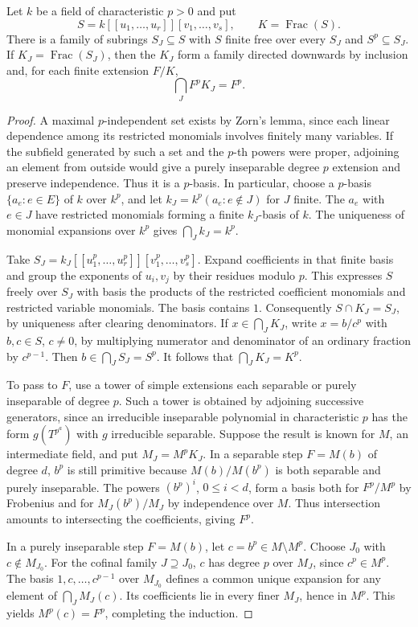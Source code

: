 \begin{lemma}\label{res:X04}
Let \(k\) be a field of characteristic \(p>0\) and put
\[
 S=k[[u_1,\ldots,u_r]][v_1,\ldots,v_s],\qquad K=\operatorname{Frac}(S).
\]
There is a family of subrings \(S_J\subseteq S\) with \(S\) finite free over every \(S_J\) and \(S^p\subseteq S_J\). If \(K_J=\operatorname{Frac}(S_J)\), then the \(K_J\) form a family directed downwards by inclusion and, for each finite extension \(F/K\),
\[
                    \bigcap_J F^pK_J=F^p .
\]
\end{lemma}
\begin{proof}
A maximal \(p\)-independent set exists by Zorn's lemma, since each linear dependence among its restricted monomials involves finitely many variables. If the subfield generated by such a set and the \(p\)-th powers were proper, adjoining an element from outside would give a purely inseparable degree \(p\) extension and preserve independence. Thus it is a \(p\)-basis. In particular, choose a \(p\)-basis \(\{a_e:e\in E\}\) of \(k\) over \(k^p\), and let \(k_J=k^p(a_e:e\notin J)\) for \(J\) finite. The \(a_e\) with \(e\in J\) have restricted monomials forming a finite \(k_J\)-basis of \(k\). The uniqueness of monomial expansions over \(k^p\) gives \(\bigcap_J k_J=k^p\).

Take \(S_J=k_J[[u_1^p,\ldots,u_r^p]][v_1^p,\ldots,v_s^p]\). Expand coefficients in that finite basis and group the exponents of \(u_i,v_j\) by their residues modulo \(p\). This expresses \(S\) freely over \(S_J\) with basis the products of the restricted coefficient monomials and restricted variable monomials. The basis contains \(1\). Consequently \(S\cap K_J=S_J\), by uniqueness after clearing denominators. If \(x\in\bigcap_J K_J\), write \(x=b/c^p\) with \(b,c\in S\), \(c\ne0\), by multiplying numerator and denominator of an ordinary fraction by \(c^{p-1}\). Then \(b\in\bigcap_JS_J=S^p\). It follows that \(\bigcap_J K_J=K^p\).

To pass to \(F\), use a tower of simple extensions each separable or purely inseparable of degree \(p\). Such a tower is obtained by adjoining successive generators, since an irreducible inseparable polynomial in characteristic \(p\) has the form \(g(T^{p^a})\) with \(g\) irreducible separable. Suppose the result is known for \(M\), an intermediate field, and put \(M_J=M^p K_J\). In a separable step \(F=M(b)\) of degree \(d\), \(b^p\) is still primitive because \(M(b)/M(b^p)\) is both separable and purely inseparable. The powers \((b^p)^i\), \(0\le i<d\), form a basis both for \(F^p/M^p\) by Frobenius and for \(M_J(b^p)/M_J\) by independence over \(M\). Thus intersection amounts to intersecting the coefficients, giving \(F^p\).

In a purely inseparable step \(F=M(b)\), let \(c=b^p\in M\setminus M^p\). Choose \(J_0\) with \(c\notin M_{J_0}\). For the cofinal family \(J\supseteq J_0\), \(c\) has degree \(p\) over \(M_J\), since \(c^p\in M^p\). The basis \(1,c,\ldots,c^{p-1}\) over \(M_{J_0}\) defines a common unique expansion for any element of \(\bigcap_J M_J(c)\). Its coefficients lie in every finer \(M_J\), hence in \(M^p\). This yields \(M^p(c)=F^p\), completing the induction.
\end{proof}

